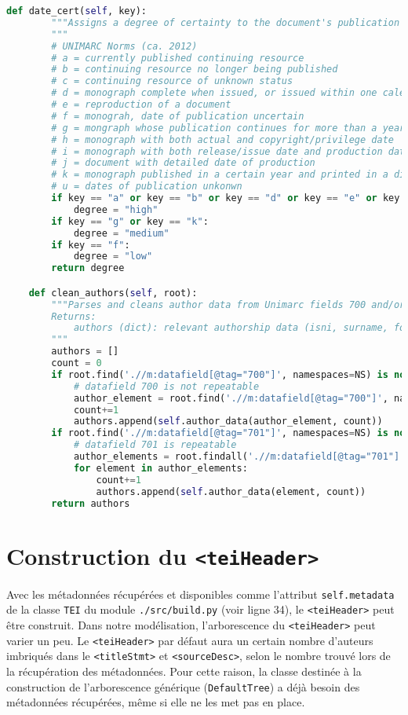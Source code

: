 \documentclass[class=article, crop=false]{standalone}
\begin{document}
\begin{lstlisting}[language=python, style=python]
    def date_cert(self, key):
        """Assigns a degree of certainty to the document's publication date.
        """
        # UNIMARC Norms (ca. 2012)
        # a = currently published continuing resource
        # b = continuing resource no longer being published
        # c = continuing resource of unknown status
        # d = monograph complete when issued, or issued within one calendar year
        # e = reproduction of a document
        # f = monograh, date of publication uncertain
        # g = mongraph whose publication continues for more than a year
        # h = monograph with both actual and copyright/privilege date
        # i = monograph with both release/issue date and production date
        # j = document with detailed date of production
        # k = monograph published in a certain year and printed in a different year
        # u = dates of publication unkonwn
        if key == "a" or key == "b" or key == "d" or key == "e" or key == "h" or key == "i" or key == "j":
            degree = "high"
        if key == "g" or key == "k":
            degree = "medium"
        if key == "f":
            degree = "low"
        return degree

    def clean_authors(self, root):
        """Parses and cleans author data from Unimarc fields 700 and/or 701.
        Returns:
            authors (dict): relevant authorship data (isni, surname, forename, xml:id)
        """
        authors = []
        count = 0
        if root.find('.//m:datafield[@tag="700"]', namespaces=NS) is not None:
            # datafield 700 is not repeatable
            author_element = root.find('.//m:datafield[@tag="700"]', namespaces=NS)
            count+=1
            authors.append(self.author_data(author_element, count))
        if root.find('.//m:datafield[@tag="701"]', namespaces=NS) is not None:
            # datafield 701 is repeatable
            author_elements = root.findall('.//m:datafield[@tag="701"]', namespaces=NS)
            for element in author_elements:
                count+=1
                authors.append(self.author_data(element, count))
        return authors

\end{lstlisting}

\section{Construction du \texttt{<teiHeader>}}
Avec les métadonnées récupérées et disponibles comme l'attribut \texttt{self.metadata} de la classe \texttt{TEI} du module \texttt{./src/build.py} (voir ligne 34), le \texttt{<teiHeader>} peut être construit. Dans notre modélisation, l'arborescence du \texttt{<teiHeader>} peut varier un peu. Le \texttt{<teiHeader>} par défaut aura un certain nombre d'auteurs imbriqués dans le \texttt{<titleStmt>} et \texttt{<sourceDesc>}, selon le nombre trouvé lors de la récupération des métadonnées. Pour cette raison, la classe destinée à la construction de l'arborescence générique (\texttt{DefaultTree}) a déjà besoin des métadonnées récupérées, même si elle ne les met pas en place.
\end{document}
